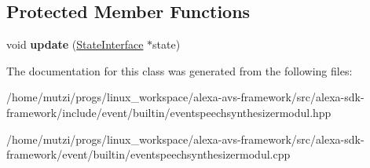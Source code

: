 \subsection*{Protected Member Functions}
\begin{DoxyCompactItemize}
\item 
\mbox{\label{classAlexaEvent_1_1EventSpeechSynthesizerModul_aa23c571ac991fa376eb12a9fd94f1b84}} 
void {\bfseries update} (\hyperlink{classAlexaEvent_1_1StateInterface}{State\+Interface} $\ast$state)
\end{DoxyCompactItemize}


The documentation for this class was generated from the following files\+:\begin{DoxyCompactItemize}
\item 
/home/mutzi/progs/linux\+\_\+workspace/alexa-\/avs-\/framework/src/alexa-\/sdk-\/framework/include/event/builtin/eventspeechsynthesizermodul.\+hpp\item 
/home/mutzi/progs/linux\+\_\+workspace/alexa-\/avs-\/framework/src/alexa-\/sdk-\/framework/event/builtin/eventspeechsynthesizermodul.\+cpp\end{DoxyCompactItemize}
